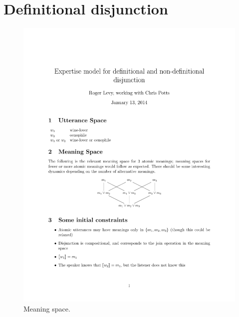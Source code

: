 \section{Definitional disjunction}\label{sec:defdisj}

\begin{figure}[htp]
  \centering
  \includegraphics[scale=1]{images/meaningspace}
  \caption{Meaning space.}
  \label{fig:meaningspace}
\end{figure}


